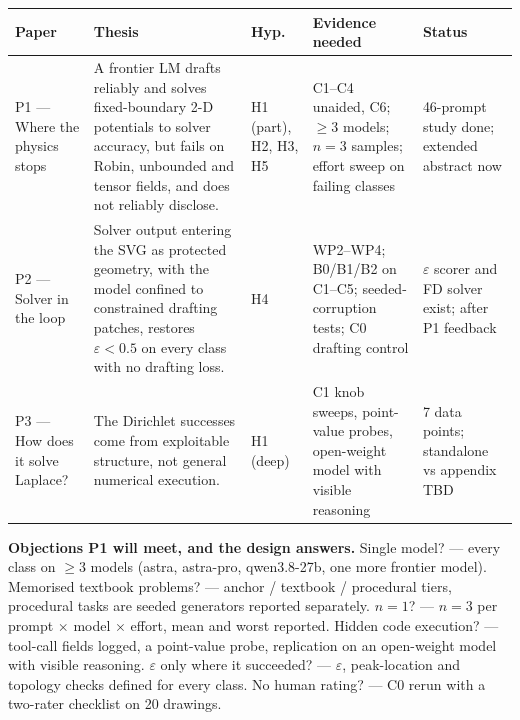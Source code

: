 \documentclass[11pt,a4paper]{article}
\begin{document}
\begin{longtable}{L{2.6cm} L{4.8cm} L{1.6cm} L{3.4cm} L{2.4cm}}
\toprule
Paper & Thesis & Hyp. & Evidence needed & Status \\
\midrule
P1 --- Where the physics stops & A frontier LM drafts reliably and solves fixed-boundary 2-D potentials to solver accuracy, but fails on Robin, unbounded and tensor fields, and does not reliably disclose. & H1 (part), H2, H3, H5 & C1--C4 unaided, C6; $\ge 3$ models; $n=3$ samples; effort sweep on failing classes & 46-prompt study done; extended abstract now \\
P2 --- Solver in the loop & Solver output entering the SVG as protected geometry, with the model confined to constrained drafting patches, restores $\varepsilon<0.5$ on every class with no drafting loss. & H4 & WP2--WP4; B0/B1/B2 on C1--C5; seeded-corruption tests; C0 drafting control & $\varepsilon$ scorer and FD solver exist; after P1 feedback \\
P3 --- How does it solve Laplace? & The Dirichlet successes come from exploitable structure, not general numerical execution. & H1 (deep) & C1 knob sweeps, point-value probes, open-weight model with visible reasoning & 7 data points; standalone vs appendix TBD \\
\bottomrule
\end{longtable}

\textbf{Objections P1 will meet, and the design answers.} Single model? --- every class on $\ge 3$ models (astra, astra-pro, qwen3.8-27b, one more frontier model). Memorised textbook problems? --- anchor / textbook / procedural tiers, procedural tasks are seeded generators reported separately. $n=1$? --- $n=3$ per prompt $\times$ model $\times$ effort, mean and worst reported. Hidden code execution? --- tool-call fields logged, a point-value probe, replication on an open-weight model with visible reasoning. $\varepsilon$ only where it succeeded? --- $\varepsilon$, peak-location and topology checks defined for every class. No human rating? --- C0 rerun with a two-rater checklist on 20 drawings.
\end{document}
